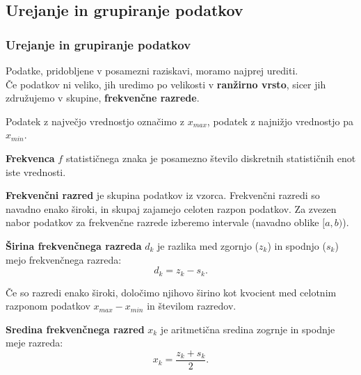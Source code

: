     \subsection{Urejanje in grupiranje podatkov}

        \begin{frame}
            \frametitle{Urejanje in grupiranje podatkov}

            \begin{block}{}
                Podatke, pridobljene v posamezni raziskavi, moramo najprej urediti. \\
                Če podatkov ni veliko, jih uredimo po velikosti v \textbf{ranžirno vrsto}, sicer jih združujemo v skupine, \textbf{frekvenčne razrede}.
            \end{block}

            \begin{block}{}
                Podatek z največjo vrednostjo označimo z $x_{max}$, podatek z najnižjo vrednostjo pa $x_{min}$.
            \end{block}

            \begin{alertblock}{}
                \textbf{Frekvenca} $f$ statističnega znaka je posamezno število diskretnih statističnih enot iste vrednosti.
            \end{alertblock}

            \begin{alertblock}{}
                \textbf{Frekvenčni razred} je skupina podatkov iz vzorca. Frekvenčni razredi so navadno enako široki,
                in skupaj zajamejo celoten razpon podatkov. Za zvezen nabor podatkov za frekvenčne razrede izberemo intervale (navadno oblike $[a,b)$).
            \end{alertblock}

        \end{frame}

        \begin{frame}
            \begin{alertblock}{}
                \textbf{Širina frekvenčnega razreda} $d_k$ je razlika med zgornjo ($z_k$) in spodnjo ($s_k$) mejo frekvenčnega razreda:
                $$d_k=z_k-s_k.$$
            \end{alertblock}

            \begin{block}{}
                Če so razredi enako široki, določimo njihovo širino kot kvocient med celotnim razponom podatkov $x_{max}-x_{min}$ in številom razredov.
            \end{block}

            \begin{alertblock}{}
                \textbf{Sredina frekvenčnega razred} $x_k$ je aritmetična sredina zogrnje in spodnje meje razreda: 
                $$x_k=\dfrac{z_k+s_k}{2}.$$
            \end{alertblock}
        \end{frame}

